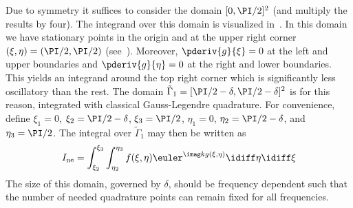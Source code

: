 Due to symmetry it suffices to consider the domain $[0,\PI/2]^2$ (and multiply the results by four). The integrand over this domain is visualized in~. In this domain we have stationary points in the origin and at the upper right corner $(\xi,\eta) = (\PI/2,\PI/2)$ (see~). Moreover, $\pderiv{g}{\xi}=0$ at the left and upper boundaries and $\pderiv{g}{\eta}=0$ at the right and lower boundaries. This yields an integrand around the top right corner which is significantly less oscillatory than the rest. The domain $\tilde{\Gamma}_1=[\PI/2-\delta,\PI/2-\delta]^2$ is for this reason, integrated with classical Gauss-Legendre quadrature. For convenience, define $\xi_1=0$, $\xi_2=\PI/2-\delta$, $\xi_3=\PI/2$, $\eta_1=0$, $\eta_2=\PI/2-\delta$, and $\eta_3=\PI/2$. The integral over $\tilde{\Gamma}_1$ may then be written as
\begin{equation*}
	I_{\mathrm{ne}} = \int_{\xi_2}^{\xi_3}\int_{\eta_2}^{\eta_3} f(\xi,\eta)\euler^{\imag k g(\xi,\eta)}\idiff\eta\idiff \xi
\end{equation*}
The size of this domain, governed by $\delta$, should be frequency dependent such that the number of needed quadrature points can remain fixed for all frequencies. 


